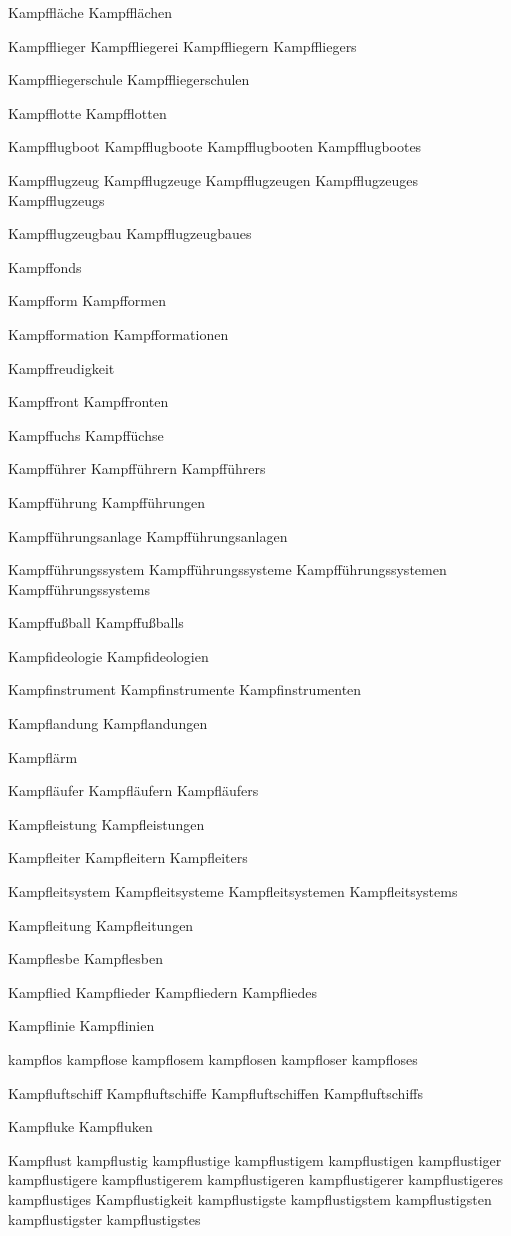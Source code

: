 Kampffläche
Kampfflächen

Kampfflieger
Kampffliegerei
Kampffliegern
Kampffliegers

Kampffliegerschule
Kampffliegerschulen

Kampfflotte
Kampfflotten

Kampfflugboot
Kampfflugboote
Kampfflugbooten
Kampfflugbootes

Kampfflugzeug
Kampfflugzeuge
Kampfflugzeugen
Kampfflugzeuges
Kampfflugzeugs

Kampfflugzeugbau
Kampfflugzeugbaues

Kampffonds

Kampfform
Kampfformen

Kampfformation
Kampfformationen

Kampffreudigkeit

Kampffront
Kampffronten

Kampffuchs
Kampffüchse

Kampfführer
Kampfführern
Kampfführers

Kampfführung
Kampfführungen

Kampfführungsanlage
Kampfführungsanlagen

Kampfführungssystem
Kampfführungssysteme
Kampfführungssystemen
Kampfführungssystems

Kampffußball
Kampffußballs

Kampfideologie
Kampfideologien

Kampfinstrument
Kampfinstrumente
Kampfinstrumenten

Kampflandung
Kampflandungen

Kampflärm

Kampfläufer
Kampfläufern
Kampfläufers

Kampfleistung
Kampfleistungen

Kampfleiter
Kampfleitern
Kampfleiters

Kampfleitsystem
Kampfleitsysteme
Kampfleitsystemen
Kampfleitsystems

Kampfleitung
Kampfleitungen

Kampflesbe
Kampflesben

Kampflied
Kampflieder
Kampfliedern
Kampfliedes

Kampflinie
Kampflinien

kampflos
kampflose
kampflosem
kampflosen
kampfloser
kampfloses

Kampfluftschiff
Kampfluftschiffe
Kampfluftschiffen
Kampfluftschiffs

Kampfluke
Kampfluken

Kampflust
kampflustig
kampflustige
kampflustigem
kampflustigen
kampflustiger
kampflustigere
kampflustigerem
kampflustigeren
kampflustigerer
kampflustigeres
kampflustiges
Kampflustigkeit
kampflustigste
kampflustigstem
kampflustigsten
kampflustigster
kampflustigstes

